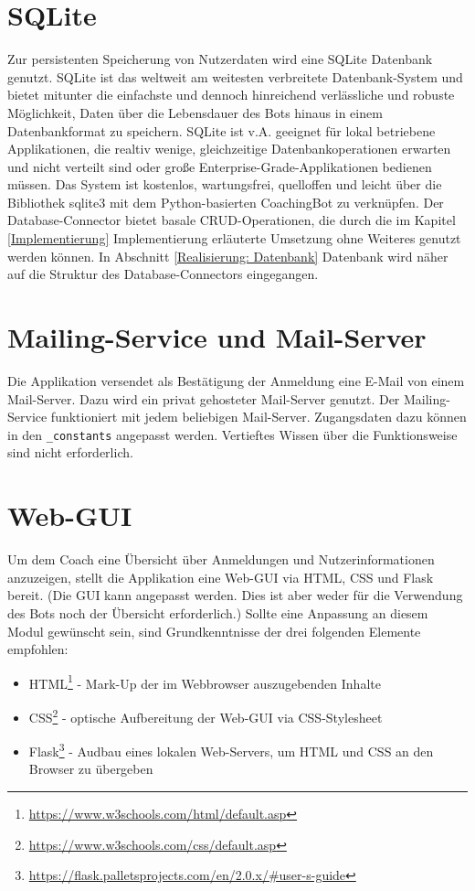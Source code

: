     \section{SQLite}
        Zur persistenten Speicherung von Nutzerdaten wird eine SQLite Datenbank \cite{sqlite} genutzt. SQLite ist das weltweit am weitesten verbreitete Datenbank-System und bietet mitunter die einfachste und dennoch hinreichend verlässliche und robuste Möglichkeit, Daten über die Lebensdauer des Bots hinaus in einem Datenbankformat zu speichern. SQLite ist v.A. geeignet für lokal betriebene Applikationen, die realtiv wenige, gleichzeitige Datenbankoperationen erwarten und nicht verteilt sind oder große Enterprise-Grade-Applikationen bedienen müssen. Das System ist kostenlos, wartungsfrei, quelloffen und leicht über die Bibliothek sqlite3 \cite{sqlite3API} mit dem Python-basierten CoachingBot zu verknüpfen. Der Database-Connector bietet basale CRUD-Operationen, die durch die im Kapitel \ref{Implementierung} Implementierung erläuterte Umsetzung ohne Weiteres genutzt werden können. In Abschnitt \ref{Realisierung: Datenbank} Datenbank wird näher auf die Struktur des Database-Connectors eingegangen. 


    \section{Mailing-Service und Mail-Server}
        Die Applikation versendet als Bestätigung der Anmeldung eine E-Mail von einem Mail-Server. Dazu wird ein privat gehosteter Mail-Server genutzt. Der Mailing-Service funktioniert mit jedem beliebigen Mail-Server. Zugangsdaten dazu können in den \verb|_constants| angepasst werden. Vertieftes Wissen über die Funktionsweise sind nicht erforderlich.


    \section{Web-GUI}
        Um dem Coach eine Übersicht über Anmeldungen und Nutzerinformationen anzuzeigen, stellt die Applikation eine Web-GUI via HTML, CSS und Flask bereit. (Die GUI kann angepasst werden. Dies ist aber weder für die Verwendung des Bots noch der Übersicht erforderlich.) Sollte eine Anpassung an diesem Modul gewünscht sein, sind Grundkenntnisse der drei folgenden Elemente empfohlen: 
        \begin{itemize}
            \item HTML\footnote{\url{https://www.w3schools.com/html/default.asp}} - Mark-Up der im Webbrowser auszugebenden Inhalte
            \item CSS\footnote{\url{https://www.w3schools.com/css/default.asp}} - optische Aufbereitung der Web-GUI via CSS-Stylesheet
            \item Flask\footnote{\url{https://flask.palletsprojects.com/en/2.0.x/\#user-s-guide}} - Audbau eines lokalen Web-Servers, um HTML und CSS an den Browser zu übergeben
        \end{itemize}    

